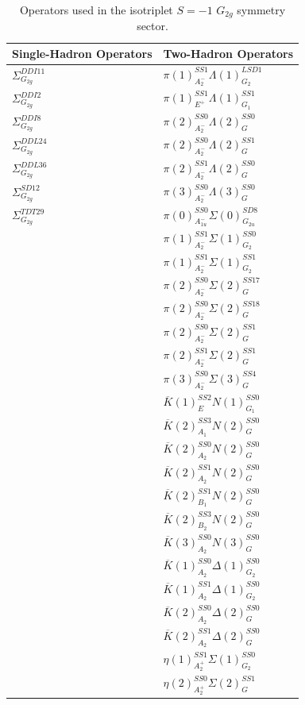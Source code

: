 \begin{table}[H]
    \centering
    \begin{tabular}{l|l}
        \textbf{Single-Hadron Operators} & \textbf{Two-Hadron Operators} \\
        \hline
        $\Sigma_{G_{2g}}^{DDI11}$ & $\pi(1)_{A_2^-}^{SS1}\Lambda(1)_{G_2}^{LSD1}$\\
        $\Sigma_{G_{2g}}^{DDI2}$ & $\pi(1)_{E^+}^{SS1}\Lambda(1)_{G_1}^{SS1}$\\
        $\Sigma_{G_{2g}}^{DDI8}$ & $\pi(2)_{A_2^-}^{SS0}\Lambda(2)_{G}^{SS0}$\\
        $\Sigma_{G_{2g}}^{DDL24}$ & $\pi(2)_{A_2^-}^{SS0}\Lambda(2)_{G}^{SS1}$\\
        $\Sigma_{G_{2g}}^{DDL36}$ & $\pi(2)_{A_2^-}^{SS1}\Lambda(2)_{G}^{SS0}$\\
        $\Sigma_{G_{2g}}^{SD12}$ & $\pi(3)_{A_2^-}^{SS0}\Lambda(3)_{G}^{SS0}$\\
        $\Sigma_{G_{2g}}^{TDT29}$ & $\pi(0)_{A_{1u}^-}^{SS0}\Sigma(0)_{G_{2u}}^{SD8}$\\
        & $\pi(1)_{A_2^-}^{SS1}\Sigma(1)_{G_2}^{SS0}$\\
        & $\pi(1)_{A_2^-}^{SS1}\Sigma(1)_{G_2}^{SS1}$\\
        & $\pi(2)_{A_2^-}^{SS0}\Sigma(2)_{G}^{SS17}$\\
        & $\pi(2)_{A_2^-}^{SS0}\Sigma(2)_{G}^{SS18}$\\
        & $\pi(2)_{A_2^-}^{SS0}\Sigma(2)_{G}^{SS1}$\\
        & $\pi(2)_{A_2^-}^{SS1}\Sigma(2)_{G}^{SS1}$\\
        & $\pi(3)_{A_2^-}^{SS0}\Sigma(3)_{G}^{SS4}$\\
        & $\overline K(1)_{E}^{SS2}N(1)_{G_1}^{SS0}$\\
        & $\overline K(2)_{A_1}^{SS3}N(2)_{G}^{SS0}$\\
        & $\overline K(2)_{A_2}^{SS0}N(2)_{G}^{SS0}$\\
        & $\overline K(2)_{A_2}^{SS1}N(2)_{G}^{SS0}$\\
        & $\overline K(2)_{B_1}^{SS1}N(2)_{G}^{SS0}$\\
        & $\overline K(2)_{B_2}^{SS3}N(2)_{G}^{SS0}$\\
        & $\overline K(3)_{A_2}^{SS0}N(3)_{G}^{SS0}$\\
        & $\overline K(1)_{A_2}^{SS0}\Delta(1)_{G_2}^{SS0}$\\
        & $\overline K(1)_{A_2}^{SS1}\Delta(1)_{G_2}^{SS0}$\\
        & $\overline K(2)_{A_2}^{SS0}\Delta(2)_{G}^{SS0}$\\
        & $\overline K(2)_{A_2}^{SS1}\Delta(2)_{G}^{SS0}$\\
        & $\eta(1)_{A_2^+}^{SS1}\Sigma(1)_{G_2}^{SS0}$\\
        & $\eta(2)_{A_2^+}^{SS0}\Sigma(2)_{G}^{SS1}$
    \end{tabular}
    \caption{Operators used in the isotriplet $S=-1$ $G_{2g}$ symmetry sector.}\label{table:g2g_ops}
\end{table}
